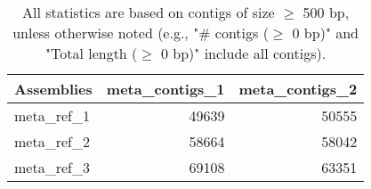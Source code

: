 \documentclass[12pt,a4paper]{article}
\begin{document}
\begin{table}[ht]
\begin{center}
\caption{All statistics are based on contigs of size $\geq$ 500 bp, unless otherwise noted (e.g., "\# contigs ($\geq$ 0 bp)" and "Total length ($\geq$ 0 bp)" include all contigs).}
\begin{tabular}{|l*{2}{|r}|}
\hline
Assemblies & meta\_contigs\_1 & meta\_contigs\_2 \\ \hline
meta\_ref\_1 & 49639 & 50555 \\ \hline
meta\_ref\_2 & 58664 & 58042 \\ \hline
meta\_ref\_3 & 69108 & 63351 \\ \hline
\end{tabular}
\end{center}
\end{table}
\end{document}

